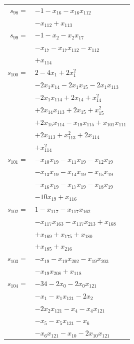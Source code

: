 \begin{longtable}{@{}r@{\;}l@{}}
\(s_{98}=\) & \(\displaystyle -1 -x_{16} -x_{16}x_{112}\) \\
 & \(\displaystyle -x_{112} +x_{113}\) \\[3pt]
\(s_{99}=\) & \(\displaystyle -1 -x_{2} -x_{2}x_{17}\) \\
 & \(\displaystyle -x_{17} -x_{17}x_{112} -x_{112}\) \\
 & \(\displaystyle +x_{114}\) \\[3pt]
\(s_{100}=\) & \(\displaystyle 2 -4x_{1} +2x_{1}^{2}\) \\
 & \(\displaystyle -2x_{1}x_{14} -2x_{1}x_{15} -2x_{1}x_{113}\) \\
 & \(\displaystyle -2x_{1}x_{114} +2x_{14} +x_{14}^{2}\) \\
 & \(\displaystyle +2x_{14}x_{113} +2x_{15} +x_{15}^{2}\) \\
 & \(\displaystyle +2x_{15}x_{114} -x_{19}x_{115} +x_{101}x_{111}\) \\
 & \(\displaystyle +2x_{113} +x_{113}^{2} +2x_{114}\) \\
 & \(\displaystyle +x_{114}^{2}\) \\[3pt]
\(s_{101}=\) & \(\displaystyle -x_{10}x_{19} -x_{11}x_{19} -x_{12}x_{19}\) \\
 & \(\displaystyle -x_{13}x_{19} -x_{14}x_{19} -x_{15}x_{19}\) \\
 & \(\displaystyle -x_{16}x_{19} -x_{17}x_{19} -x_{18}x_{19}\) \\
 & \(\displaystyle -10x_{19} +x_{116}\) \\[3pt]
\(s_{102}=\) & \(\displaystyle 1 -x_{117} -x_{117}x_{162}\) \\
 & \(\displaystyle -x_{117}x_{163} -x_{117}x_{213} +x_{168}\) \\
 & \(\displaystyle +x_{169} +x_{175} +x_{180}\) \\
 & \(\displaystyle +x_{185} +x_{216}\) \\[3pt]
\(s_{103}=\) & \(\displaystyle -x_{19} -x_{19}x_{202} -x_{19}x_{203}\) \\
 & \(\displaystyle -x_{19}x_{208} +x_{118}\) \\[3pt]
\(s_{104}=\) & \(\displaystyle -34 -2x_{0} -2x_{0}x_{121}\) \\
 & \(\displaystyle -x_{1} -x_{1}x_{121} -2x_{2}\) \\
 & \(\displaystyle -2x_{2}x_{121} -x_{4} -x_{4}x_{121}\) \\
 & \(\displaystyle -x_{5} -x_{5}x_{121} -x_{6}\) \\
 & \(\displaystyle -x_{6}x_{121} -x_{10} -2x_{10}x_{121}\) \\

\end{longtable}

